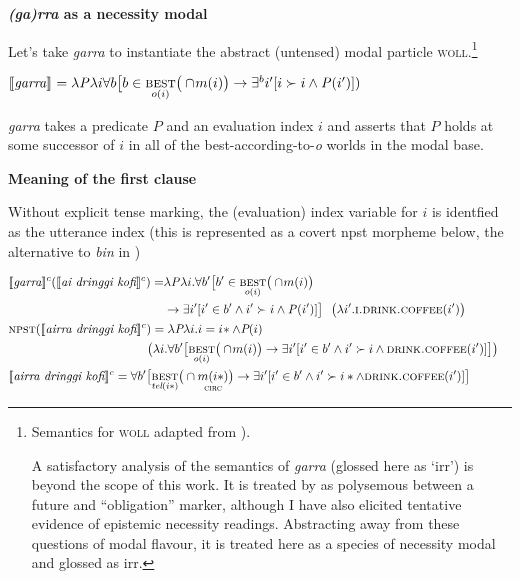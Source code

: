 \a \textbf{\textit{(ga)rra} as a necessity modal}

Let's take \textit{garra} to instantiate the abstract (untensed) modal particle \textsc{woll}.\footnote{Semantics for \textsc{woll} adapted from \citet[71]{Condoravdi2002}).
	
	A satisfactory analysis of the semantics of \textit{garra} (glossed here as `\gls{irr}') is beyond the scope of this work. It is treated by \cite{Schultze-Berndt} as polysemous between a future and ``obligation'' marker, although I have also elicited tentative evidence of epistemic necessity readings. Abstracting away from these questions of modal flavour, it is treated here as a species of necessity modal and glossed as \gls{irr}.}

$ \denote{\textit{garra}} =\lambda\mathit P\lambda i\forall b\big[b\in\underset{o(i)}{\textsc{best}}\big(\cap\!m(i)\big)\to\exists ^bi'[i\succ i\wedge\mathit P(i')])$

\textit{garra} takes a predicate $ \textit{P} $ and an evaluation index $ i $ and asserts that $ \textit{P} $ holds at some successor of $ i $ in all of the best-according-to-\textit{o} worlds in the modal base.



\a \textbf{Meaning of the first clause} 

Without explicit tense marking, the (evaluation) index variable for $ i $ is identfied as the utterance index (this is represented as a covert \gls{npst} morpheme below, the alternative to \textit{bin} in )


\begin{align*}
&\begin{aligned}\denote[c]{\textit{garra}}(\denote[c]{\textit{ai dringgi kofi}}) =&\lambda\mathit P\lambda i.\forall b'\big[b'\in\underset{o(i)}{\textsc{best}}\big(\cap\!m(i)\big)\\&\to\exists i'[i'\in b'\wedge i'\succ i\wedge\mathit P(i')]\big]~~\big(\lambda i'.\textsc{i.drink.coffee}(i')\big)\end{aligned}\\
&\begin{aligned}\textsc{npst}(\denote[c]{\textit{airra dringgi kofi}})=\lambda\textit{P}\lambda i.i=i\!*\wedge\textit{P}(i)\\
	\big(\lambda i.\forall b'\big[\underset{o(i)}{\textsc{best}}\big(\cap\!m(i)\big)&\to\exists i'[i'\in b'\wedge i'\succ i\wedge\textsc{drink.coffee}(i')]\big]\big) \end{aligned}\\
&\begin{aligned}	\denote[c]{\textit{airra dringgi kofi}}=\forall b'\big[\underset{\textit{tel}(i*)}{\textsc{best}}\big(\cap\underset{\textsc{circ}}{m(i*)}\big)&\to\exists i'[i'\in b'\wedge i'\succ i*\wedge\textsc{drink.coffee}(i')]\big]\end{aligned}
\end{align*}

